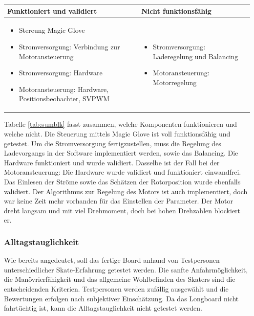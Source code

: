 \begin{center}
	\begin{tabular}{p{}|p{}}
		Funktioniert und validiert & Nicht funktionsfähig \\ \hline 
		\begin{itemize}
			\item Stereung Magic Glove
			\item Stromversorgung: Verbindung zur Motoransteuerung
			\item Stromversorgung: Hardware
			\item Motoransteuerung: Hardware, Positionsbeobachter, SVPWM
		\end{itemize}
		&
		\begin{itemize}
			\item Stromversorgung: Laderegelung und Balancing
			\item Motoransteuerung: Motorregelung
		\end{itemize}
		\\ \hline
	\end{tabular} 
	\label{tab:sumblk}
\end{center}

Tabelle \ref{tab:sumblk} fasst zusammen, welche Komponenten funktionieren und welche nicht. Die Steuerung mittels Magic Glove ist voll funktionsfähig und getestet. Um die Stromversorgung fertigzustellen, muss die Regelung des Ladevorgangs in der Software implementiert werden, sowie das Balancing. %
Die Hardware funktioniert und wurde validiert. Dasselbe ist der Fall bei der Motoransteuerung: Die Hardware wurde validiert und funktioniert einwandfrei. Das Einlesen der Ströme sowie das Schätzen der Rotorposition wurde ebenfalls validiert. Der Algorithmus zur Regelung des Motors ist auch implementiert, doch war keine Zeit mehr vorhanden für das Einstellen der Parameter. Der Motor dreht langsam und mit viel Drehmoment, doch bei hohen Drehzahlen blockiert er.

\subsubsection*{Alltagstauglichkeit} \label{ValidAlltag}
Wie bereits angedeutet, soll das fertige Board anhand von Testpersonen unterschiedlicher Skate-Erfahrung getestet werden. Die sanfte Anfahrmöglichkeit, die Manövrierfähigkeit und das allgemeine Wohlbefinden des Skaters sind die entscheidenden Kriterien. 
Testpersonen werden zufällig ausgewählt und die Bewertungen erfolgen nach subjektiver Einschätzung. 
Da das Longboard nicht fahrtüchtig ist, kann die Alltagstauglichkeit nicht getestet werden.

